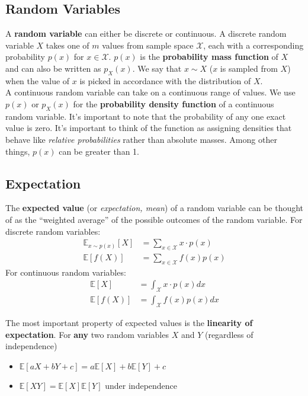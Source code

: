 \documentclass{harvardml}
\theoremstyle{definition}
\theoremstyle{plain}
\newcommand{\E}{\mathbb{E}}
\newcommand{\mcX}{\mathcal{X}}
\begin{document}
    \subsection{Random Variables}
		A \textbf{random variable} can either be discrete or continuous. 
		A discrete random variable $X$ takes one of $m$ values from sample 
		space $\mcX$, each with a corresponding probability $p(x)$ for 
		$x\in \mcX$. $p(x)$ is the \textbf{probability mass function} of 
		$X$ and can also be written as $p_X(x)$. We say that $x \sim X$ 
		($x$ is sampled from $X$) when the value of $x$ is picked in 
		accordance with the distribution of $X$.\\

		\noindent A continuous random variable can take on a continuous 
		range of values. We use $p(x)$ or $p_X(x)$ for the 
		\textbf{probability density function} of a continuous random 
		variable. It's important to note that the probability of any one 
		exact value is zero. It's important to think of the function as
        assigning densities that behave like \textit{relative probabilities} 
		rather than absolute masses. Among other things, $p(x)$ can be 
		greater than 1.

    \subsection{Expectation}
            
		The \textbf{expected value} (or \textit{expectation, mean}) 
		of a random variable can be thought of as the ``weighted average'' 
		of the possible outcomes of the random variable. For discrete 
		random variables:
		\begin{align*}
  			\E_{x \sim p(x)}[X] &= 
			\sum_{x \in \mathcal{X}} x \cdot p(x) \\
  			\E[f(X)] &= \sum_{x \in \mcX} f(x) p(x)
		\end{align*}
		For continuous random variables:
		\begin{align*}
  			\E[X] &= \int_{\mcX} x \cdot p(x) dx \\
  			\E[f(X)] &= \int_{\mcX} f(x) p(x) dx
		\end{align*}

		\noindent The most important property of expected values is the 
		\textbf{linearity of expectation}. For \textbf{any} two random 
		variables $X$ and $Y$ (regardless of independence)
		\begin{itemize}
			\item $\E[aX + bY + c] = a\E[X] + b\E[Y] + c$
			\item $\E[XY] = \E[X]\E[Y]$ under independence
		\end{itemize}
\end{document}
